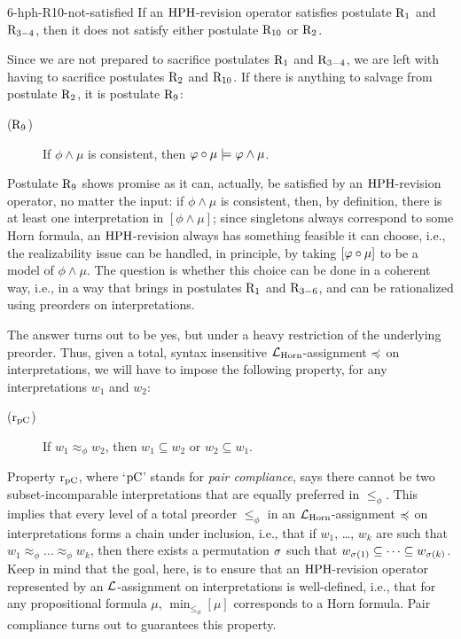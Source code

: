 \begin{crl}{}{6-hph-R10-not-satisfied}
	If an ${\mathrm{HPH}}$-revision operator satisfies postulate $\mathrm{R}_{1}$ and $\mathrm{R}_{3-4}$,
	then it does not satisfy either postulate $\mathrm{R}_{10}$ or $\mathrm{R}_{2}$.
\end{crl}

Since we are not prepared
to sacrifice postulates $\mathrm{R}_{1}$ and $\mathrm{R}_{3-4}$, 
we are left with having 
to sacrifice postulates $\mathrm{R}_{2}$ and $\mathrm{R}_{10}$.
If there is anything to salvage from postulate $\mathrm{R}_{2}$,
it is postulate $\mathrm{R}_{9}$:

\begin{description}
	\item[($\mathrm{R}_{9}$)] If $\phi\land\mu$ is consistent, 
		then $\varphi\circ\mu\models\varphi\land\mu$.
\end{description}

Postulate $\mathrm{R}_{9}$ shows promise as it can, actually, 
be satisfied by an ${\mathrm{HPH}}$-revision operator, no matter the input:
if $\phi\land\mu$ is consistent, then, by definition,
there is at least one interpretation in $[\phi\land\mu]$;
since singletons always correspond to some Horn formula, an
${\mathrm{HPH}}$-revision always has something feasible it can choose,
i.e., the realizability issue can be handled, in principle, by 
taking $[\varphi\circ\mu]$ to be a model of $\phi\land\mu$.
The question is whether this choice can be done in a coherent way,
i.e., in a way that brings in postulates $\mathrm{R}_{1}$ and $\mathrm{R}_{3-6}$,
and can be rationalized using preorders on interpretations.

The answer turns out to be yes, but under a heavy restriction 
of the underlying preorder.
Thus, given a total, syntax insensitive 
$\mathcal{L}_{\mathrm{Horn}}$-assignment $\preccurlyeq$ on interpretations,
we will have to impose the following property,
for any interpretations $w_{1}$ and $w_{2}$:

\begin{description}
	\item[($\mathrm{r}_{\mathrm{pC}}$)] If $w_1\approx_{\phi}w_2$,
		then $w_1\subseteq w_2$ or $w_2\subseteq w_1$.
\end{description}

Property $\mathrm{r}_{\mathrm{pC}}$, where `$\mathrm{pC}$' stands for \emph{pair compliance},
says there cannot be two subset-incomparable interpretations 
that are equally preferred in $\le_{\phi}$.
This implies that every level of a total preorder
$\le_{\phi}$ in an $\mathcal{L}_{\mathrm{Horn}}$-assignment $\preccurlyeq$ on interpretations
forms a chain under inclusion,
i.e., that if $w_1$, \dots, $w_k$ are such that 
$w_1\approx_{\phi} \dots \approx_{\phi} w_k$,
then there exists a permutation $\sigma$
such that $w_{\sigma(1)} \subseteq \dots \subseteq w_{\sigma(k)}$.
Keep in mind that the goal, here, is to ensure that an ${\mathrm{HPH}}$-revision operator
represented by an $\mathcal{L}$-assignment on interpretations is well-defined,
i.e., that for any propositional formula $\mu$,
$\min_{\le_{\phi}}[\mu]$ corresponds to a Horn formula.
Pair compliance turns out to guarantees this property.

